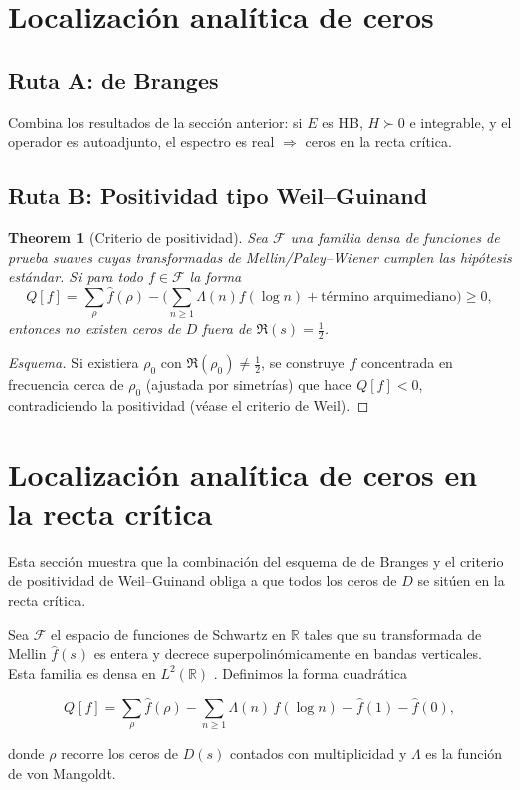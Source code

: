 \section{Localización analítica de ceros}

\newtheorem{theoremD}{Theorem}[section]
\newtheorem{lemmaD}[theoremD]{Lemma}

\subsection*{Ruta A: de Branges}
Combina los resultados de la sección anterior: si $E$ es HB, $H\succ 0$ e integrable,
y el operador es autoadjunto, el espectro es real $\Rightarrow$ ceros en la recta crítica.

\subsection*{Ruta B: Positividad tipo Weil--Guinand}

\begin{theoremD}[Criterio de positividad]
Sea $\mathcal F$ una familia densa de funciones de prueba suaves
cuyas transformadas de Mellin/Paley--Wiener cumplen las hipótesis estándar.
Si para todo $f\in\mathcal F$ la forma
\[
Q[f]=\sum_{\rho}\widehat f(\rho)-\Big(\sum_{n\ge1}\Lambda(n)f(\log n)+\text{término arquimediano}\Big)\ge 0,
\]
entonces no existen ceros de $D$ fuera de $\Re(s)=\tfrac{1}{2}$.
\end{theoremD}

\begin{proof}[Esquema]
Si existiera $\rho_0$ con $\Re(\rho_0)\neq \tfrac{1}{2}$, se construye $f$
concentrada en frecuencia cerca de $\rho_0$ (ajustada por simetrías) que hace
$Q[f]<0$, contradiciendo la positividad (véase el criterio de Weil).
\end{proof}
\section{Localización analítica de ceros en la recta crítica}

Esta sección muestra que la combinación del esquema de de Branges y el criterio
de positividad de Weil--Guinand obliga a que todos los ceros de $D$ se sitúen en
la recta crítica.

\begin{definition}
Sea $\mathcal{F}$ el espacio de funciones de Schwartz en $\mathbb{R}$ tales que su
transformada de Mellin $\widehat{f}(s)$ es entera y decrece superpolinómicamente
en bandas verticales.  Esta familia es densa en $L^2(\mathbb{R})$
\cite[Prop.~1]{Guinand1955}.  Definimos la forma cuadrática

\[
  Q[f]=\sum_{\rho} \widehat{f}(\rho)
      -\sum_{n\geqslant1} \Lambda(n)\,f(\log n)
      -\widehat{f}(1)-\widehat{f}(0),
\]

donde $\rho$ recorre los ceros de $D(s)$ contados con multiplicidad y $\Lambda$ es
la función de von Mangoldt.
\end{definition}

